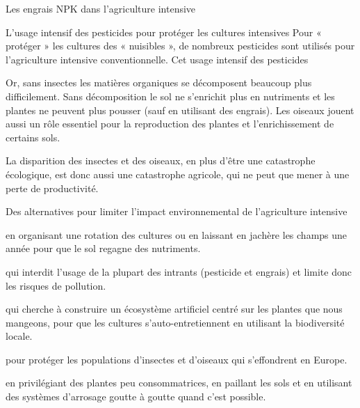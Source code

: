 \begin{doc}{Les engrais NPK dans l'agriculture intensive}
\end{doc}

\begin{doc}{L'usage intensif des pesticides pour protéger les cultures intensives}
  Pour « protéger » les cultures des « nuisibles », de nombreux pesticides sont utilisés pour l'agriculture intensive conventionnelle.
  Cet usage intensif des pesticides 

  Or, sans insectes les matières organiques se décomposent beaucoup plus difficilement.
  Sans décomposition le sol ne s'enrichit plus en nutriments et les plantes ne peuvent plus pousser (sauf en utilisant des engrais).
  Les oiseaux jouent aussi un rôle essentiel pour la reproduction des plantes et l'enrichissement de certains sols. 

  La disparition des insectes et des oiseaux, en plus d'être une catastrophe écologique, est donc aussi une catastrophe agricole, qui ne peut que mener à une perte de productivité.%
\end{doc}

\begin{doc}{Des alternatives pour limiter l'impact environnemental de l'agriculture intensive}
  \begin{listePoints}
    \item {} en organisant une rotation des cultures ou en laissant en jachère les champs une année pour que le sol regagne des nutriments.
    \item {} qui interdit l'usage de la plupart des intrants (pesticide et engrais) et limite donc les risques de pollution.
    \item {} qui cherche à construire un écosystème artificiel centré sur les plantes que nous mangeons, pour que les cultures s'auto-entretiennent en utilisant la biodiversité locale.
    \item {} pour protéger les populations d'insectes et d'oiseaux qui s'effondrent en Europe.
    \item {} en privilégiant des plantes peu consommatrices, en paillant les sols et en utilisant des systèmes d'arrosage goutte à goutte quand c'est possible.
  \end{listePoints}
\end{doc}